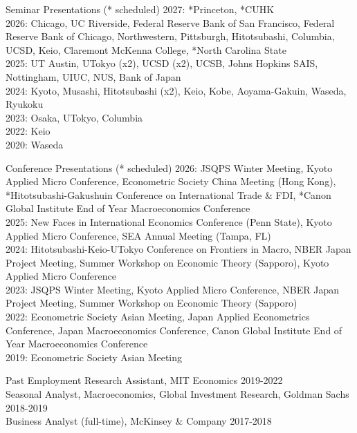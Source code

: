 \documentclass{resume} %
\begin{document}
\begin{rSection}{Seminar Presentations (* scheduled)}
    2027: *Princeton, *CUHK\\
    2026: Chicago, UC Riverside, Federal Reserve Bank of San Francisco, Federal Reserve Bank of Chicago, Northwestern, Pittsburgh, Hitotsubashi, Columbia, UCSD, Keio, Claremont McKenna College, *North Carolina State\\
    2025: UT Austin, UTokyo (x2), UCSD (x2), UCSB, Johns Hopkins SAIS, Nottingham, UIUC, NUS, Bank of Japan \\
    2024: Kyoto, Musashi, Hitotsubashi (x2), Keio, Kobe, Aoyama-Gakuin, Waseda, Ryukoku \\
    2023: Osaka, UTokyo, Columbia \\
    2022: Keio\\
    2020: Waseda
\end{rSection}


\begin{rSection}{Conference Presentations (* scheduled)}
    2026: JSQPS Winter Meeting, Kyoto Applied Micro Conference, Econometric Society China Meeting (Hong Kong), *Hitotsubashi-Gakushuin Conference on International Trade \& FDI, *Canon Global Institute End of Year Macroeconomics Conference \\
    2025: New Faces in International Economics Conference (Penn State), Kyoto Applied Micro Conference, SEA Annual Meeting (Tampa, FL)\\
    2024: Hitotsubashi-Keio-UTokyo Conference on Frontiers in Macro, NBER Japan Project Meeting, Summer Workshop on Economic Theory (Sapporo), Kyoto Applied Micro Conference\\
    2023: JSQPS  Winter Meeting, Kyoto Applied Micro Conference, NBER Japan Project Meeting, Summer Workshop on Economic Theory (Sapporo)\\
    2022: Econometric Society Asian Meeting, Japan Applied Econometrics Conference, Japan Macroeconomics Conference, Canon Global Institute End of Year Macroeconomics Conference\\
    2019: Econometric Society Asian Meeting
\end{rSection}

\begin{rSection}{Past Employment}
Research Assistant, MIT Economics \hfill 2019-2022\\
Seasonal Analyst, Macroeconomics,
Global Investment Research, Goldman Sachs \hfill 2018-2019\\
Business Analyst (full-time), McKinsey \& Company \hfill 2017-2018
\end{rSection}
\end{document}
